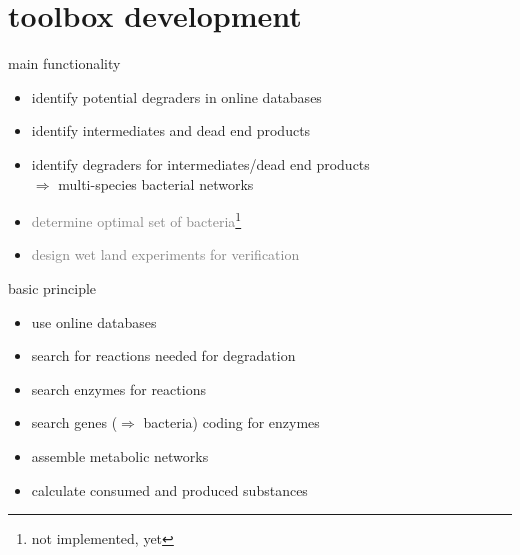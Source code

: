 \documentclass[style=ufz]{powerdot}
\begin{document}
\section{toolbox development}

\begin{slide}{main functionality}
\begin{itemize}
 \item identify potential degraders in online databases\newline\pause
 \item identify intermediates and dead end products\newline\pause
 \item identify degraders for intermediates/dead end products\newline\pause \\
 \indent $\Rightarrow$ multi-species bacterial networks\newline\pause
 \item \textcolor{gray}{determine optimal set of bacteria\footnote{not implemented, yet}}\newline\pause
 \item \textcolor{gray}{design wet land experiments for verification\footnotemark[1]}
\end{itemize}

\end{slide}

\begin{slide}{basic principle}
\begin{itemize}
 \item use online databases\newline\pause
 \item search for reactions needed for degradation\newline\pause
 \item search enzymes for reactions\newline\pause
 \item search genes ($\Rightarrow$ bacteria) coding for enzymes\newline\pause
 \item assemble metabolic networks\newline\pause
 \item calculate consumed and produced substances
\end{itemize}
\end{slide}
\end{document}
